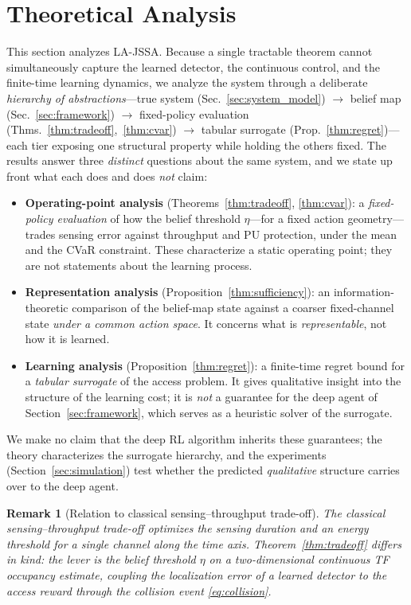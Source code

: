 \documentclass[journal]{IEEEtran}
\newtheorem{remark}{Remark}
\newcommand{\thr}{\eta}                    %
\begin{document}
\section{Theoretical Analysis}
\label{sec:theory}

This section analyzes LA-JSSA. Because a single tractable theorem cannot
simultaneously capture the learned detector, the continuous control, and the
finite-time learning dynamics, we analyze the system through a deliberate
\emph{hierarchy of abstractions}---true system (Sec.~\ref{sec:system_model})
$\to$ belief map (Sec.~\ref{sec:framework}) $\to$ fixed-policy evaluation
(Thms.~\ref{thm:tradeoff},~\ref{thm:cvar}) $\to$ tabular surrogate
(Prop.~\ref{thm:regret})---each tier exposing one structural property while
holding the others fixed. The results answer three \emph{distinct} questions
about the same system, and we state up front what each does and does
\emph{not} claim:
\begin{itemize}
\item \textbf{Operating-point analysis} (Theorems~\ref{thm:tradeoff},
\ref{thm:cvar}): a \emph{fixed-policy evaluation} of how the belief threshold
$\thr$---for a fixed action geometry---trades sensing error against
throughput and PU protection, under the mean and the CVaR constraint. These
characterize a static operating point; they are not statements about the
learning process.
\item \textbf{Representation analysis} (Proposition~\ref{thm:sufficiency}):
an information-theoretic comparison of the belief-map state against a coarser
fixed-channel state \emph{under a common action space}. It concerns what is
\emph{representable}, not how it is learned.
\item \textbf{Learning analysis} (Proposition~\ref{thm:regret}): a finite-time
regret bound for a \emph{tabular surrogate} of the access problem. It gives
qualitative insight into the structure of the learning cost; it is
\emph{not} a guarantee for the deep agent of Section~\ref{sec:framework},
which serves as a heuristic solver of the surrogate.
\end{itemize}
We make no claim that the deep RL algorithm inherits these guarantees; the
theory characterizes the surrogate hierarchy, and the experiments
(Section~\ref{sec:simulation}) test whether the predicted \emph{qualitative}
structure carries over to the deep agent.

\begin{remark}[Relation to classical sensing--throughput trade-off]
The classical sensing--throughput trade-off \cite{liang2008sensing} optimizes
the \emph{sensing duration} and an energy threshold for a \emph{single}
channel along the time axis. Theorem~\ref{thm:tradeoff} differs in kind: the
lever is the belief threshold $\thr$ on a \emph{two-dimensional} continuous
TF occupancy estimate, coupling the localization error of a learned detector
to the \emph{access} reward through the collision event
\eqref{eq:collision}.
\end{remark}
\end{document}
